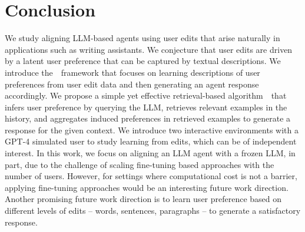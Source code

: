 \section{Conclusion}
We study aligning LLM-based agents using user edits that arise naturally in applications such as writing assistants. We conjecture that user edits are driven by a latent user preference that can be captured by textual descriptions. We introduce the~\framework~framework that focuses on learning descriptions of user preferences from user edit data and then generating an agent response accordingly. We propose a simple yet effective retrieval-based algorithm~\algname~that infers user preference by querying the LLM, retrieves relevant examples in the history, and aggregates induced preferences in retrieved examples to generate a response for the given context. We introduce two interactive environments with a GPT-4 simulated user to study learning from edits, which can be of independent interest. In this work, we focus on aligning an LLM agent with a frozen LLM, in part, due to the challenge of scaling fine-tuning based approaches with the number of users. However, for settings where computational cost is not a barrier, applying fine-tuning approaches would be an interesting future work direction. Another promising future work direction is to learn user preference based on different levels of edits -- words, sentences, paragraphs -- to generate a satisfactory response.





